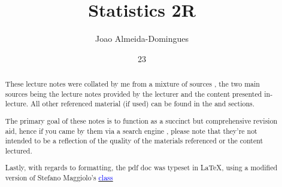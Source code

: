 \documentclass[english,course]{Notes}
\title{Statistics 2R}
\author{Joao Almeida-Domingues}
\date{23}{09}{2019}
\begin{document}

\begin{abstract}
	\par{These lecture notes were collated by me from a mixture of sources , the two main sources being the lecture notes provided by the lecturer and the 
content presented in-lecture. All other referenced material (if used) can be found in the  and  sections.}
	\par{The primary goal of these notes is to function as a succinct but comprehensive revision aid, hence if you came by them via a search engine , please note 
that they're not intended to be a reflection of the quality of the materials referenced or the content lectured.}
	\par{Lastly, with regards to formatting, the pdf doc was typeset in \LaTeX , using a modified version of Stefano Maggiolo's \href{http://blog.poormansmath.net/
latex-class-for-lecture-notes/}{\underline{\textcolor{blue}{class}}}}
\end{abstract}
\newpage
\newpage









\newpage

\todos


\nocite{*}
\printbibliography

\end{document}
